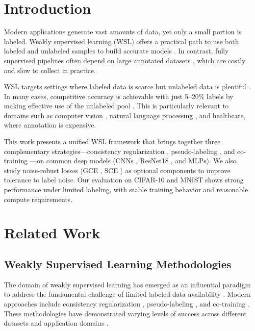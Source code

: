 \documentclass{ieeeaccess}
\begin{document}
\titlepgskip=-15pt

\maketitle

\section{Introduction}
\label{sec:introduction}

Modern applications generate vast amounts of data, yet only a small portion is labeled. Weakly supervised learning (WSL) offers a practical path to use both labeled and unlabeled samples to build accurate models \cite{b1,b2,b3}. In contrast, fully supervised pipelines often depend on large annotated datasets \cite{b4,b5}, which are costly and slow to collect in practice.

WSL targets settings where labeled data is scarce but unlabeled data is plentiful \cite{b1,b2,b3}. In many cases, competitive accuracy is achievable with just 5--20\% labels by making effective use of the unlabeled pool \cite{b6,b7,b8}. This is particularly relevant to domains such as computer vision \cite{b9,b10}, natural language processing \cite{b11}, and healthcare, where annotation is expensive.

This work presents a unified WSL framework that brings together three complementary strategies---consistency regularization \cite{b1}, pseudo-labeling \cite{b2}, and co-training \cite{b3}---on common deep models (CNNs \cite{b9}, ResNet18 \cite{b10}, and MLPs). We also study noise-robust losses (GCE \cite{b12}, SCE \cite{b13}) as optional components to improve tolerance to label noise. Our evaluation on CIFAR-10 and MNIST shows strong performance under limited labeling, with stable training behavior and reasonable compute requirements.

\section{Related Work}
\label{sec:related_work}

\subsection{Weakly Supervised Learning Methodologies}
The domain of weakly supervised learning has emerged as an influential paradigm to address the fundamental challenge of limited labeled data availability \cite{b14,b15}. Modern approaches include consistency regularization \cite{b1,b16}, pseudo-labeling \cite{b2,b17}, and co-training \cite{b3,b18}. These methodologies have demonstrated varying levels of success across different datasets and application domains \cite{b19,b20}.
\end{document}
